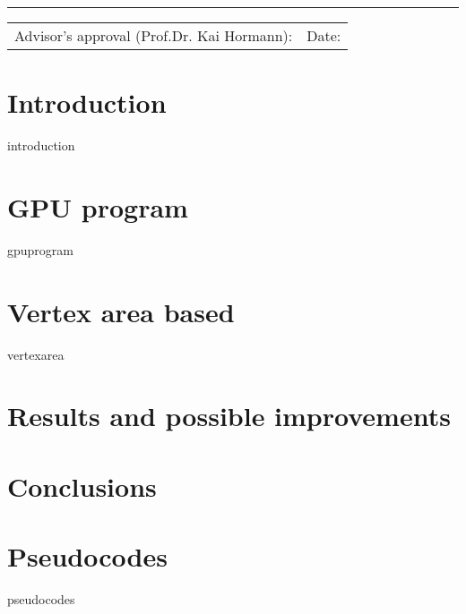 \documentclass[12pt]{article}
\theoremstyle{definition}
\theoremstyle{definition}
\theoremstyle{plain}
\theoremstyle{plain}
\theoremstyle{plain}
\theoremstyle{plain}
\theoremstyle{definition}
\theoremstyle{remark}
\theoremstyle{remark}
\theoremstyle{remark}
\theoremstyle{remark}
\newcommand{\ADVISOR}{Prof.Dr. Kai Hormann}
\begin{document}
\vspace{-.1cm}\rule{\textwidth}{0.4pt}

\begin{small}
  \begin{tabular}{@{} p{} l @{}}
    Advisor's approval (\ADVISOR): & Date:
  \end{tabular}
\end{small}



\newpage \tableofcontents

\newpage \section{Introduction}
{introduction}

\newpage \section{GPU program}
{gpuprogram}

\newpage \section{Vertex area based}
{vertexarea}



\newpage \section{Results and possible improvements}

\newpage \section{Conclusions}

\newpage




\appendix
\newpage \section{Pseudocodes}
{pseudocodes}


\end{document}
